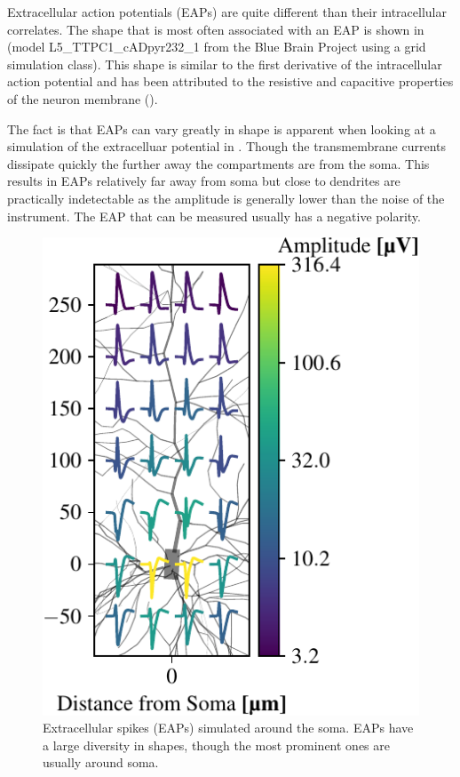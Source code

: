 \documentclass[altfont, fleqn]{uiophd}
\renewcommand{\cref}[1]{{\color{viridis_03}\mycref{#1}}}
\begin{document}
Extracellular action potentials (EAPs)
are quite different than their intracellular correlates. 
The shape that is most often associated with an EAP is 
shown in \cref{fig:2_eap} 
(model L5\_TTPC1\_cADpyr232\_1 from 
the Blue Brain Project using a grid simulation class). 
This shape is similar to the first derivative of the intracellular
action potential and has been 
attributed to the resistive
and capacitive properties of the neuron membrane
(\textcite{brooks_electrical_1947, henze_intracellular_2000}). 

The fact is that EAPs can vary greatly in shape is 
apparent when looking at a simulation of the extracelluar potential 
in 
\cref{fig:2_eap_grid}.
Though the transmembrane currents dissipate quickly 
the further away the compartments are from the soma.
This results in EAPs relatively far away from soma but close
to dendrites are practically indetectable as the amplitude 
is generally lower than the noise of the instrument. 
The EAP that can be measured usually has a negative
polarity.
\begin{figure}
    \vspace{-20pt}
    \begin{center}
        \includegraphics[width=\linewidth]{images/sec_2/grid_y_x_signals_2d_normalized.pdf}
        \vspace{-20pt}
        \caption{%
            Extracellular spikes (EAPs) simulated around the soma. 
            EAPs have a large diversity in shapes, though the most prominent
            ones are usually around soma. 
        }
        \label{fig:2_eap_grid}
        \vspace{-10pt}
    \end{center}
\end{figure}
\end{document}
